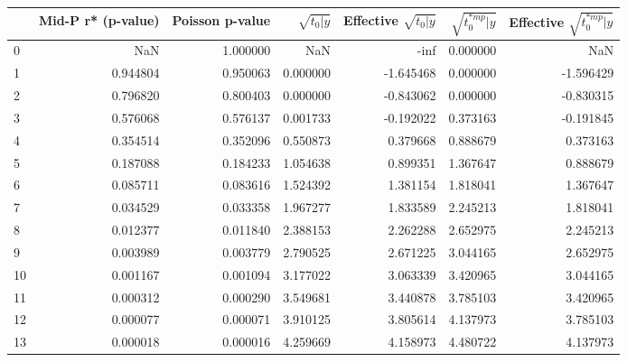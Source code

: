 \begin{tabular}{lrrrrrr}
\toprule
 & Mid-P r* (p-value) & Poisson p-value & $\sqrt{t_0\vert y}$ & Effective $\sqrt{t_0\vert y}$ & $\sqrt{t_0^{*mp}\vert y}$ & Effective $\sqrt{t_0^{*mp}\vert y}$ \\
\midrule
0 & NaN & 1.000000 & NaN & -inf & 0.000000 & NaN \\
1 & 0.944804 & 0.950063 & 0.000000 & -1.645468 & 0.000000 & -1.596429 \\
2 & 0.796820 & 0.800403 & 0.000000 & -0.843062 & 0.000000 & -0.830315 \\
3 & 0.576068 & 0.576137 & 0.001733 & -0.192022 & 0.373163 & -0.191845 \\
4 & 0.354514 & 0.352096 & 0.550873 & 0.379668 & 0.888679 & 0.373163 \\
5 & 0.187088 & 0.184233 & 1.054638 & 0.899351 & 1.367647 & 0.888679 \\
6 & 0.085711 & 0.083616 & 1.524392 & 1.381154 & 1.818041 & 1.367647 \\
7 & 0.034529 & 0.033358 & 1.967277 & 1.833589 & 2.245213 & 1.818041 \\
8 & 0.012377 & 0.011840 & 2.388153 & 2.262288 & 2.652975 & 2.245213 \\
9 & 0.003989 & 0.003779 & 2.790525 & 2.671225 & 3.044165 & 2.652975 \\
10 & 0.001167 & 0.001094 & 3.177022 & 3.063339 & 3.420965 & 3.044165 \\
11 & 0.000312 & 0.000290 & 3.549681 & 3.440878 & 3.785103 & 3.420965 \\
12 & 0.000077 & 0.000071 & 3.910125 & 3.805614 & 4.137973 & 3.785103 \\
13 & 0.000018 & 0.000016 & 4.259669 & 4.158973 & 4.480722 & 4.137973 \\
\bottomrule
\end{tabular}
